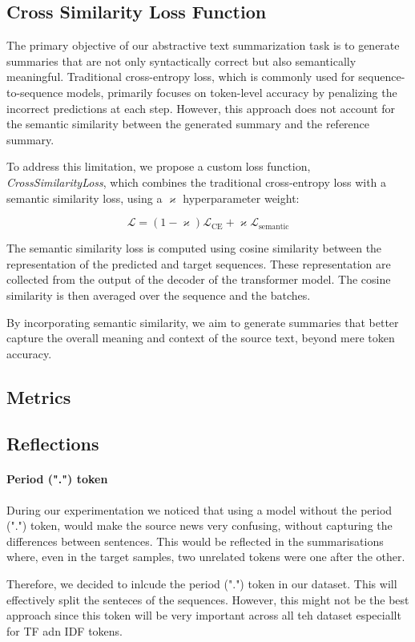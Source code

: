\documentclass[a4paper, 11pt]{article}
\begin{document}
\subsection{Cross Similarity Loss Function}
The primary objective of our abstractive text summarization task is to generate summaries that are not only syntactically correct but also semantically meaningful. Traditional cross-entropy loss, which is commonly used for sequence-to-sequence models, primarily focuses on token-level accuracy by penalizing the incorrect predictions at each step. However, this approach does not account for the semantic similarity between the generated summary and the reference summary.

To address this limitation, we propose a custom loss function, \textit{CrossSimilarityLoss}, which combines the traditional cross-entropy loss\cite{CrossEnrtopyLoss} with a semantic similarity loss, using a $\varkappa$ hyperparameter weight:

\begin{equation}
    \mathcal{L} = (1 - \varkappa) \mathcal{L}_{\text{CE}} + \varkappa \mathcal{L}_{\text{semantic}}
\end{equation}

The semantic similarity loss is computed using cosine similarity\cite{cosineSimilarity} between the representation of the predicted and target sequences. These representation are collected from the output of the decoder of the transformer model. The cosine similarity is then averaged over the sequence and the batches.

By incorporating semantic similarity, we aim to generate summaries that better capture the overall meaning and context of the source text, beyond mere token accuracy.

\subsection{Metrics}

\subsection{Reflections}
\paragraph{Period (".") token}
During our experimentation we noticed that using a model without the period (".") token, would make the source news very confusing, without capturing the differences between sentences. This would be reflected in the summarisations where, even in the target samples, two unrelated tokens were one after the other.

Therefore, we decided to inlcude the period (".") token in our dataset. This will effectively split the senteces of the sequences. However, this might not be the best approach since this token will be very important across all teh dataset especiallt for TF adn IDF tokens.

\clearpage{}


\end{document}
